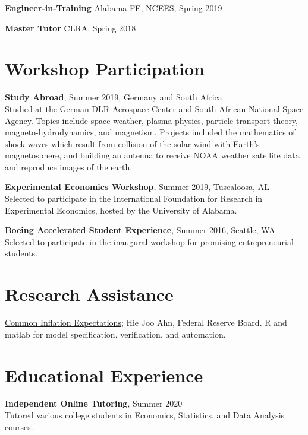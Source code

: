 \documentclass[margin,line]{res}
\begin{document}
\begin{resume}
{\bf Engineer-in-Training} Alabama FE, NCEES, Spring 2019
\vspace*{-3mm}

{\bf Master Tutor} CLRA, Spring 2018
\vspace*{-3mm}

\vspace{.75cm}
\section{\sc Workshop Participation}
    {\bf Study Abroad}, Summer 2019, Germany and South Africa\\
    {Studied at the German DLR Aerospace Center and South African National Space Agency. Topics include space weather, plasma physics, particle transport theory, magneto-hydrodynamics, and magnetism. Projects included the mathematics of shock-waves which result from collision of the solar wind with Earth's magnetosphere, and building an antenna to receive NOAA weather satellite data and reproduce images of the earth.}
    
    {\bf Experimental Economics Workshop}, Summer 2019, Tuscaloosa, AL\\
    {Selected to participate in the International Foundation for Research in Experimental Economics, hosted by the University of Alabama.}
    
    {\bf Boeing Accelerated Student Experience}, Summer 2016, Seattle, WA\\
    {Selected to participate in the inaugural workshop for promising entrepreneurial students.}

\vspace{.75cm}
\section{\sc Research Assistance}
  \href{https://www.federalreserve.gov/econres/notes/feds-notes/research-data-series-index-of-common-inflation-expectations-20210305.htm}{Common Inflation Expectations}; Hie Joo Ahn, Federal Reserve Board. R and matlab for model specification, verification, and automation. 

\vspace{.75cm}
 \section{\sc Educational Experience}
 

    {\bf Independent Online Tutoring}, Summer 2020\\
    {Tutored various college students in Economics, Statistics, and Data Analysis courses.}


\end{resume}
\end{document}
